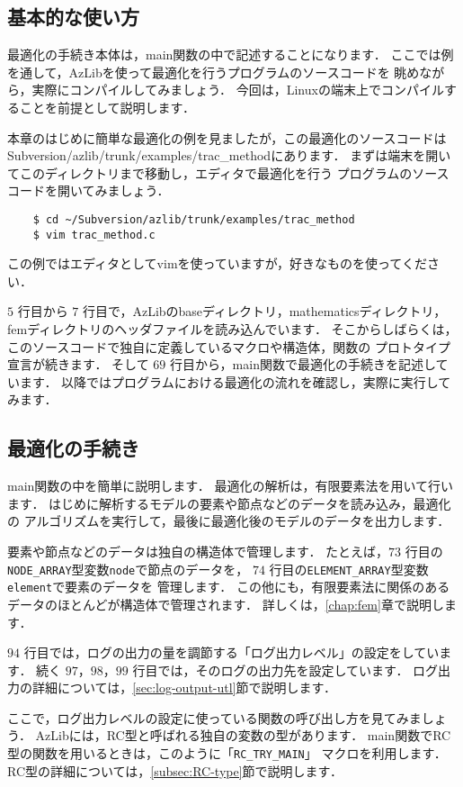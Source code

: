 \subsection{基本的な使い方}
最適化の手続き本体は，main関数の中で記述することになります．
ここでは例を通して，AzLibを使って最適化を行うプログラムのソースコードを
眺めながら，実際にコンパイルしてみましょう．
今回は，Linuxの端末上でコンパイルすることを前提として説明します．

本章のはじめに簡単な最適化の例を見ましたが，この最適化のソースコードは
Subversion/azlib/trunk/examples/trac\_methodにあります．
まずは端末を開いてこのディレクトリまで移動し，エディタで最適化を行う
プログラムのソースコードを開いてみましょう．
\begin{verbatim}
    $ cd ~/Subversion/azlib/trunk/examples/trac_method
    $ vim trac_method.c
\end{verbatim}
この例ではエディタとしてvimを使っていますが，好きなものを使ってください．

$5$ 行目から $7$ 行目で，AzLibのbaseディレクトリ，mathematicsディレクトリ，
femディレクトリのヘッダファイルを読み込んでいます．
そこからしばらくは，このソースコードで独自に定義しているマクロや構造体，関数の
プロトタイプ宣言が続きます．
そして $69$ 行目から，main関数で最適化の手続きを記述しています．
以降ではプログラムにおける最適化の流れを確認し，実際に実行してみます．

\subsection{最適化の手続き}
main関数の中を簡単に説明します．
最適化の解析は，有限要素法を用いて行います．
はじめに解析するモデルの要素や節点などのデータを読み込み，最適化の
アルゴリズムを実行して，最後に最適化後のモデルのデータを出力します．

要素や節点などのデータは独自の構造体で管理します．
たとえば，$73$ 行目の\texttt{NODE\_ARRAY}型変数\texttt{node}で節点のデータを，
$74$ 行目の\texttt{ELEMENT\_ARRAY}型変数\texttt{element}で要素のデータを
管理します．
この他にも，有限要素法に関係のあるデータのほとんどが構造体で管理されます．
詳しくは，\ref{chap:fem}章で説明します． %

$94$ 行目では，ログの出力の量を調節する「ログ出力レベル」の設定をしています．
続く $97$，$98$，$99$ 行目では，そのログの出力先を設定しています．
ログ出力の詳細については，\ref{sec:log-output-utl}節で説明します．

ここで，ログ出力レベルの設定に使っている関数の呼び出し方を見てみましょう．
AzLibには，RC型と呼ばれる独自の変数の型があります．
main関数でRC型の関数を用いるときは，このように「\texttt{RC\_TRY\_MAIN}」
マクロを利用します．
RC型の詳細については，\ref{subsec:RC-type}節で説明します．

